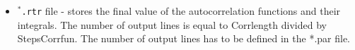 \begin{itemize}
	\item \texttt{$^{*}$\hspace{-3pt}.rtr} file - stores the final value of the autocorrelation functions and their integrals. The number of output lines is equal to Corrlength divided by StepsCorrfun. The number of output lines has to be defined in the *.par file.
\end{itemize}


%
%
%
%
%
%
%
%
%
%
%
%
%
%
%
%
%
%
%






